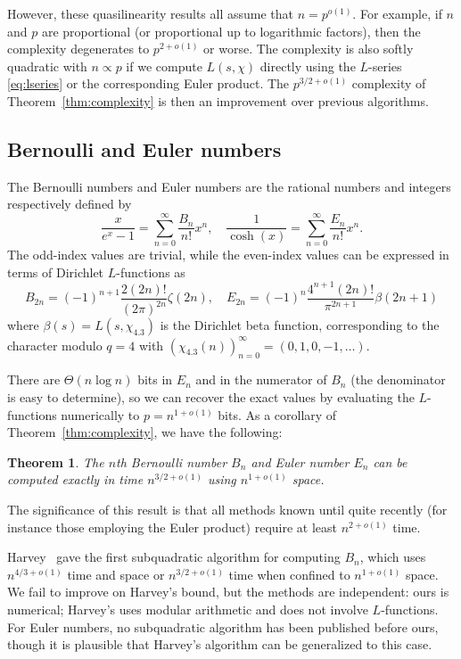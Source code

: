 \documentclass[reqno]{amsart}
\newcommand{\be}{\begin{equation}}
\newcommand{\ee}{\end{equation}}
\newtheorem{theorem}{Theorem}
\theoremstyle{definition}
\begin{document}
However, these quasilinearity results all assume that $n = p^{o(1)}$.
For example, if $n$ and $p$ are proportional (or proportional up to logarithmic factors),
then the complexity degenerates to $p^{2+o(1)}$ or worse.
The complexity is also softly quadratic
with $n \propto p$ if we compute $L(s,\chi)$ directly using the $L$-series \eqref{eq:lseries} or the corresponding
Euler product.
The $p^{3/2+o(1)}$
complexity of Theorem~\ref{thm:complexity} is then an improvement over previous algorithms.

\subsection{Bernoulli and Euler numbers}

The Bernoulli numbers and Euler numbers are the rational
numbers and integers respectively defined by
\be
\frac{x}{e^x-1} = \sum_{n=0}^{\infty} \frac{B_n}{n!} x^n, \quad
\frac{1}{\cosh(x)} = \sum_{n=0}^{\infty} \frac{E_n}{n!} x^n.
\ee
The odd-index values are trivial, while
the even-index values can be expressed in terms of Dirichlet $L$-functions
as
\begin{equation}
B_{2n} = (-1)^{n+1} \frac{2 (2n)!}{(2\pi)^{2n}} \zeta(2n), \quad E_{2n} = (-1)^n \frac{4^{n+1} (2n)!}{\pi^{2n+1}} \beta(2n+1)
\end{equation}
where $\beta(s) = L(s,\chi_{4.3})$ is
the Dirichlet beta function,
corresponding to the character modulo $q = 4$ with $(\chi_{4.3}(n))_{n=0}^{\infty} = (0, 1, 0, -1, \ldots)$.

There are $\Theta(n \log n)$ bits in $E_n$ and in the numerator of $B_n$ (the denominator is easy to determine),
so we can recover the exact values by evaluating the $L$-functions
numerically to $p = n^{1+o(1)}$ bits.
As a corollary of Theorem~\ref{thm:complexity}, we have the following:

\begin{theorem}
The $n$th Bernoulli number $B_n$ and Euler number $E_n$ can be computed exactly in time $n^{3/2+o(1)}$ using $n^{1+o(1)}$ space.
\end{theorem}

The significance of this result is that all methods known until quite recently
(for instance those employing the Euler product)
require at least $n^{2+o(1)}$ time.

Harvey~\cite{Harvey2014} gave the first
subquadratic algorithm for computing $B_n$,
which uses $n^{4/3+o(1)}$ time and space
or $n^{3/2+o(1)}$ time when confined to $n^{1+o(1)}$ space.
We fail to improve on Harvey's bound,
but the methods are independent: ours is numerical;
Harvey's uses modular arithmetic and does not involve $L$-functions.
For Euler numbers, no subquadratic algorithm has been published before ours,
though it is plausible that Harvey's algorithm can be generalized to this case.
\end{document}
